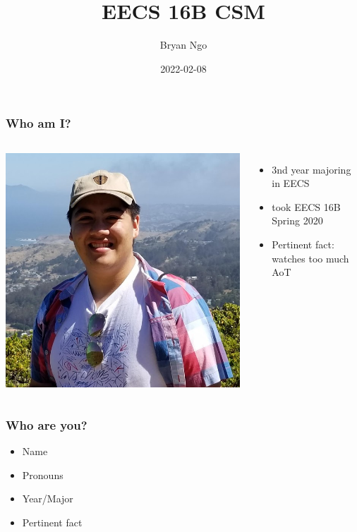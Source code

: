 \documentclass[aspectratio=169]{beamer}
\title{EECS 16B CSM}
\author{Bryan Ngo}
\date{2022-02-08}
\institute{Computer Science Mentors}
\begin{document}
\begin{frame}
    \maketitle
\end{frame}

\begin{frame}
    \tableofcontents
\end{frame}

\begin{frame}
    \frametitle{Who am I?}

    \begin{columns}
        \includegraphics[width=0.8\textheight]{bryan_ngo.png}

        \begin{itemize}
            \item 3nd year majoring in EECS
            \item took EECS 16B Spring 2020
            \item Pertinent fact: watches too much AoT
        \end{itemize}
    \end{columns}
\end{frame}

\begin{frame}
    \frametitle{Who are you?}

    \begin{itemize}
        \item Name
        \item Pronouns
        \item Year/Major
        \item Pertinent fact
    \end{itemize}
\end{frame}
\end{document}
